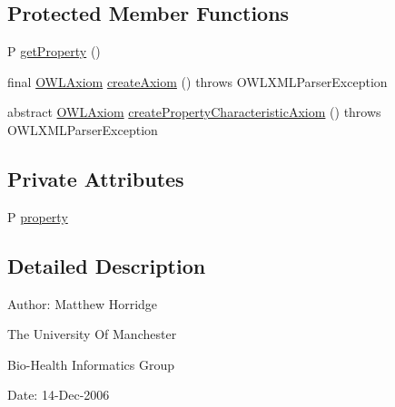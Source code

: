 \subsection*{Protected Member Functions}
\begin{DoxyCompactItemize}
\item 
P \hyperlink{classorg_1_1coode_1_1owlapi_1_1owlxmlparser_1_1_abstract_o_w_l_property_characteristic_axiom_ele9cffca01c8ac3125149e1d413d627e29_a096e403250e79d8b4c9898d75cd4887f}{get\-Property} ()
\item 
final \hyperlink{interfaceorg_1_1semanticweb_1_1owlapi_1_1model_1_1_o_w_l_axiom}{O\-W\-L\-Axiom} \hyperlink{classorg_1_1coode_1_1owlapi_1_1owlxmlparser_1_1_abstract_o_w_l_property_characteristic_axiom_ele9cffca01c8ac3125149e1d413d627e29_a9aab2e26359a41e80f2f027221a65c8c}{create\-Axiom} ()  throws O\-W\-L\-X\-M\-L\-Parser\-Exception 
\item 
abstract \hyperlink{interfaceorg_1_1semanticweb_1_1owlapi_1_1model_1_1_o_w_l_axiom}{O\-W\-L\-Axiom} \hyperlink{classorg_1_1coode_1_1owlapi_1_1owlxmlparser_1_1_abstract_o_w_l_property_characteristic_axiom_ele9cffca01c8ac3125149e1d413d627e29_a253483d0e88c97918175bebf1fb551b8}{create\-Property\-Characteristic\-Axiom} ()  throws O\-W\-L\-X\-M\-L\-Parser\-Exception
\end{DoxyCompactItemize}
\subsection*{Private Attributes}
\begin{DoxyCompactItemize}
\item 
P \hyperlink{classorg_1_1coode_1_1owlapi_1_1owlxmlparser_1_1_abstract_o_w_l_property_characteristic_axiom_ele9cffca01c8ac3125149e1d413d627e29_a90c94b32dc335fe76fe30bb008abc9fd}{property}
\end{DoxyCompactItemize}


\subsection{Detailed Description}
Author\-: Matthew Horridge\par
 The University Of Manchester\par
 Bio-\/\-Health Informatics Group\par
 Date\-: 14-\/\-Dec-\/2006\par
\par
 

